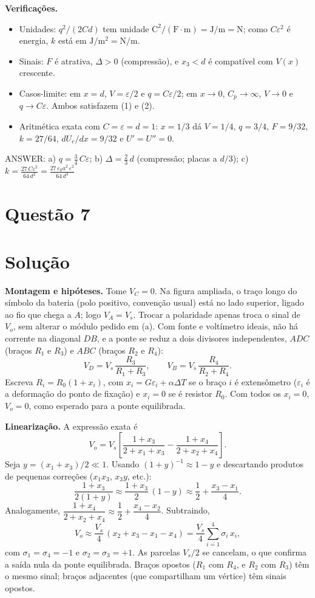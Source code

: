 \documentclass{article}%
\begin{document}
\textbf{Verificações.}
\begin{itemize}
\item Unidades: $q^2/(2Cd)$ tem unidade $\text{C}^2/(\text{F}\cdot\text{m})=\text{J}/\text{m}=\text{N}$; como $C\varepsilon^2$ é energia, $k$ está em $\text{J}/\text{m}^2=\text{N}/\text{m}$.
\item Sinais: $F$ é atrativa, $\Delta>0$ (compressão), e $x_3<d$ é compatível com $V(x)$ crescente.
\item Casos-limite: em $x=d$, $V=\varepsilon/2$ e $q=C\varepsilon/2$; em $x\to0$, $C_p\to\infty$, $V\to0$ e $q\to C\varepsilon$. Ambos satisfazem (1) e (2).
\item Aritmética exata com $C=\varepsilon=d=1$: $x=1/3$ dá $V=1/4$, $q=3/4$, $F=9/32$, $k=27/64$, $dU_e/dx=9/32$ e $U'=U''=0$.
\end{itemize}

ANSWER: a) $q=\frac{3}{4}\,C\varepsilon$; b) $\Delta=\frac{2}{3}\,d$ (compressão; placas a $d/3$); c) $k=\frac{27\,C\varepsilon^2}{64\,d^2}=\frac{27\,\varepsilon_0 a^2\,\varepsilon^2}{64\,d^3}$%
\newpage%
\section*{Questão 7}

\section*{Solução}

\textbf{Montagem e hipóteses.} Tome $V_C=0$. Na figura ampliada, o traço longo do símbolo da bateria (polo positivo, convenção usual) está no lado superior, ligado ao fio que chega a $A$; logo $V_A=V_s$. Trocar a polaridade apenas troca o sinal de $V_o$, sem alterar o módulo pedido em (a). Com fonte e voltímetro ideais, não há corrente na diagonal $DB$, e a ponte se reduz a dois divisores independentes, $ADC$ (braços $R_1$ e $R_3$) e $ABC$ (braços $R_2$ e $R_4$):
\[
V_D=V_s\,\frac{R_3}{R_1+R_3},\qquad V_B=V_s\,\frac{R_4}{R_2+R_4}.
\]
Escreva $R_i=R_0(1+x_i)$, com $x_i=G\varepsilon_i+\alpha\Delta T$ se o braço $i$ é extensômetro ($\varepsilon_i$ é a deformação do ponto de fixação) e $x_i=0$ se é resistor $R_0$. Com todos os $x_i=0$, $V_o=0$, como esperado para a ponte equilibrada.

\textbf{Linearização.} A expressão exata é
\[
V_o=V_s\left[\frac{1+x_3}{2+x_1+x_3}-\frac{1+x_4}{2+x_2+x_4}\right].
\]
Seja $y=(x_1+x_3)/2\ll 1$. Usando $(1+y)^{-1}\approx 1-y$ e descartando produtos de pequenas correções ($x_1x_3$, $x_3y$, etc.):
\[
\frac{1+x_3}{2(1+y)}\approx\frac{1+x_3}{2}\,(1-y)\approx\frac12+\frac{x_3-x_1}{4}.
\]
Analogamente, $\dfrac{1+x_4}{2+x_2+x_4}\approx\dfrac12+\dfrac{x_4-x_2}{4}$. Subtraindo,
\[
V_o\approx\frac{V_s}{4}\,(x_2+x_3-x_1-x_4)=\frac{V_s}{4}\sum_{i=1}^{4}\sigma_i\,x_i,
\]
com $\sigma_1=\sigma_4=-1$ e $\sigma_2=\sigma_3=+1$. As parcelas $V_s/2$ se cancelam, o que confirma a saída nula da ponte equilibrada. Braços opostos ($R_1$ com $R_4$, e $R_2$ com $R_3$) têm o mesmo sinal; braços adjacentes (que compartilham um vértice) têm sinais opostos.
\end{document}
